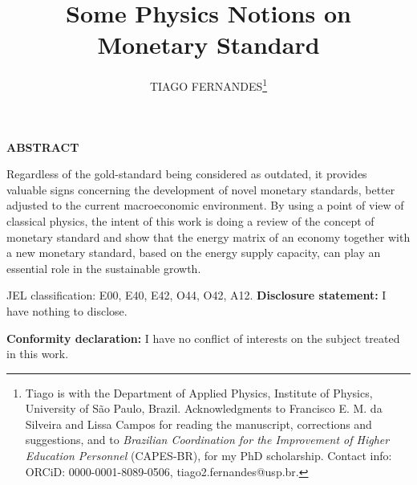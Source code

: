\documentclass[11pt]{article}
\begin{document}
\onehalfspacing      %
\renewcommand{\footnote}{\endnote}  %

\author{TIAGO FERNANDES\thanks{\rm Tiago is with the Department of Applied Physics, Institute of Physics, University of São Paulo, Brazil.
Acknowledgments to Francisco E. M. da Silveira and Lissa Campos for reading the manuscript, corrections and suggestions, and 
to \emph{Brazilian Coordination for the Improvement of Higher Education Personnel} (CAPES-BR), for my PhD scholarship.
Contact info: ORCiD: 0000-0001-8089-0506, tiago2.fernandes@usp.br.}}

\title{\Large \bf Some Physics Notions on Monetary Standard}

\date{}              %


\maketitle
\thispagestyle{empty}

\bigskip

\centerline{\bf ABSTRACT}

\begin{doublespace}  %
  \noindent Regardless of the gold-standard being considered as outdated, it provides valuable signs concerning the development of novel 
monetary standards, better adjusted to the current macroeconomic environment. By using a point of view of classical physics, the intent of 
this work is doing a review of the concept of monetary standard and show that the energy matrix of an economy together with a new monetary 
standard, based on the energy supply capacity, can play an essential role in the sustainable growth.

\end{doublespace}


\medskip

\noindent JEL classification: E00, E40, E42, O44, O42, A12.
\vfill
\noindent\textbf{Disclosure statement:} I have nothing to disclose.

\noindent\textbf{Conformity declaration:} I have no conflict of interests on the subject treated in this work.
\vfill
\end{document}
